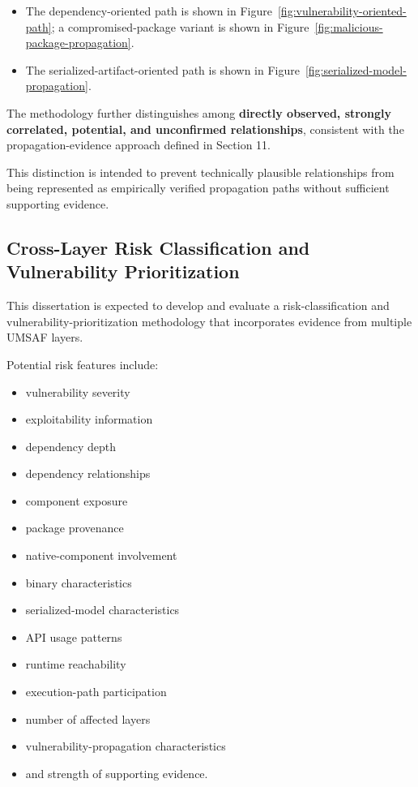 \documentclass[
  12pt,
  letterpaper,
  oneside]{report}
\providecommand{\tightlist}{%
  \setlength{\itemsep}{0pt}\setlength{\parskip}{0pt}}
\begin{document}
\begin{itemize}
\item
  The dependency-oriented path is shown in
  Figure~\ref{fig:vulnerability-oriented-path}; a compromised-package
  variant is shown in Figure~\ref{fig:malicious-package-propagation}.
\item
  The serialized-artifact-oriented path is shown in
  Figure~\ref{fig:serialized-model-propagation}.
\end{itemize}

The methodology further distinguishes among \textbf{directly observed,
strongly correlated, potential, and unconfirmed relationships},
consistent with the propagation-evidence approach defined in Section 11.

This distinction is intended to prevent technically plausible
relationships from being represented as empirically verified propagation
paths without sufficient supporting evidence.

\subsection{Cross-Layer Risk Classification and Vulnerability Prioritization}\label{1224-cross-layer-risk-classification-and-vulnerability-prioritization}

This dissertation is expected to develop and evaluate a
risk-classification and vulnerability-prioritization methodology that
incorporates evidence from multiple UMSAF layers.

Potential risk features include:

\begin{itemize}
\tightlist
\item
  vulnerability severity
\item
  exploitability information
\item
  dependency depth
\item
  dependency relationships
\item
  component exposure
\item
  package provenance
\item
  native-component involvement
\item
  binary characteristics
\item
  serialized-model characteristics
\item
  API usage patterns
\item
  runtime reachability
\item
  execution-path participation
\item
  number of affected layers
\item
  vulnerability-propagation characteristics
\item
  and strength of supporting evidence.
\end{itemize}
\end{document}
